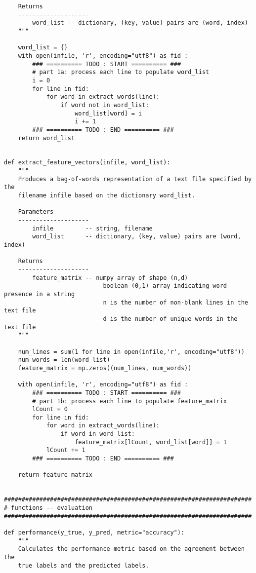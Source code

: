 \documentclass[11pt]{article}
\begin{document}
\begin{verbatim}
    Returns
    --------------------
        word_list -- dictionary, (key, value) pairs are (word, index)
    """
    
    word_list = {}
    with open(infile, 'r', encoding="utf8") as fid :
        ### ========== TODO : START ========== ###
        # part 1a: process each line to populate word_list
        i = 0
        for line in fid:
            for word in extract_words(line):
                if word not in word_list:
                    word_list[word] = i
                    i += 1
        ### ========== TODO : END ========== ###
    return word_list


def extract_feature_vectors(infile, word_list):
    """
    Produces a bag-of-words representation of a text file specified by the
    filename infile based on the dictionary word_list.
    
    Parameters
    --------------------
        infile         -- string, filename
        word_list      -- dictionary, (key, value) pairs are (word, index)
    
    Returns
    --------------------
        feature_matrix -- numpy array of shape (n,d)
                            boolean (0,1) array indicating word presence in a string
                            n is the number of non-blank lines in the text file
                            d is the number of unique words in the text file
    """
    
    num_lines = sum(1 for line in open(infile,'r', encoding="utf8"))
    num_words = len(word_list)
    feature_matrix = np.zeros((num_lines, num_words))
    
    with open(infile, 'r', encoding="utf8") as fid :
        ### ========== TODO : START ========== ###
        # part 1b: process each line to populate feature_matrix
        lCount = 0
        for line in fid:
            for word in extract_words(line):
                if word in word_list:
                    feature_matrix[lCount, word_list[word]] = 1
            lCount += 1
        ### ========== TODO : END ========== ###
        
    return feature_matrix


######################################################################
# functions -- evaluation
######################################################################

def performance(y_true, y_pred, metric="accuracy"):
    """
    Calculates the performance metric based on the agreement between the 
    true labels and the predicted labels.
    

\end{verbatim}
\end{document}

